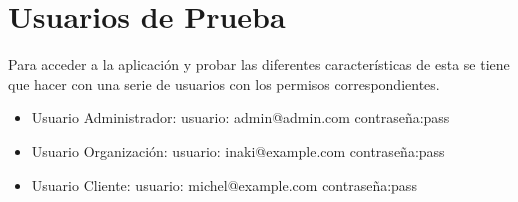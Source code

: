 \section{Usuarios de Prueba}
Para acceder a la aplicación y probar las diferentes características de esta se tiene que hacer con una serie de usuarios con los permisos correspondientes.
\begin{itemize}
    \item Usuario Administrador: usuario: admin@admin.com contraseña:pass
    \item Usuario Organización: usuario: inaki@example.com contraseña:pass
    \item Usuario Cliente: usuario: michel@example.com contraseña:pass
\end{itemize}